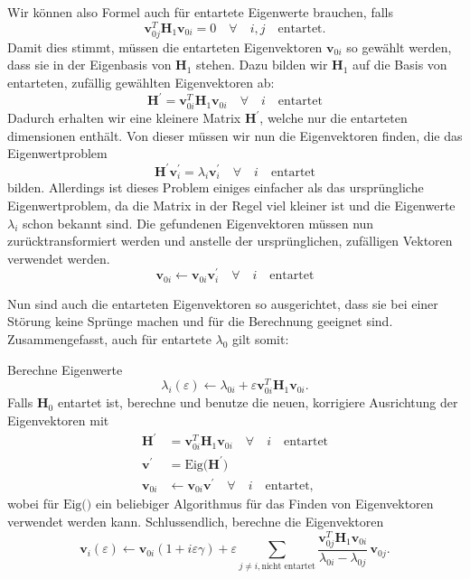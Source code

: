Wir können also Formel  auch für entartete Eigenwerte brauchen, falls
\begin{equation}
    \bm v_{0j}^T \bm H_1 \bm v_{0i} = 0 \quad \forall \quad i,j \quad \text{entartet}. \label{ew:eq:condition-degenerated}
\end{equation}
Damit dies stimmt, müssen die entarteten Eigenvektoren $\bm v_{0i}$ so gewählt werden, dass sie in der Eigenbasis von $\bm H_1$ stehen. %
Dazu bilden wir $\bm H_1$ auf die Basis von entarteten, zufällig gewählten Eigenvektoren ab:
\begin{equation}
    \bm H^\prime = \bm v_{0i}^T \bm H_1 \bm v_{0i} \quad \forall \quad i \quad \text{entartet}
\end{equation}
Dadurch erhalten wir eine kleinere Matrix $\bm H^\prime$, welche nur die entarteten dimensionen enthält.
Von dieser müssen wir nun die Eigenvektoren finden, die das Eigenwertproblem
\begin{equation}
    \bm H^\prime \bm v_{i}^\prime = \lambda_{i} \bm v_i^\prime \quad \forall \quad i \quad \text{entartet}
\end{equation}
bilden.
Allerdings ist dieses Problem einiges einfacher als das ursprüngliche Eigenwertproblem, da die Matrix in der Regel viel kleiner ist und die Eigenwerte $\lambda_i$ schon bekannt sind.
Die gefundenen Eigenvektoren müssen nun zurücktransformiert werden und anstelle der ursprünglichen, zufälligen Vektoren verwendet werden.
\begin{equation}
    \bm v_{0i} \gets \bm v_{0i} \bm v_{i}^\prime \quad \forall \quad i \quad \text{entartet}
\end{equation}

Nun sind auch die entarteten Eigenvektoren so ausgerichtet, dass sie bei einer Störung keine Sprünge machen und für die Berechnung geeignet sind.
Zusammengefasst, auch für entartete $\lambda_0$ gilt somit:
\begin{aufloesung}
Berechne Eigenwerte
\begin{equation*}
    \lambda_i(\varepsilon)
    \gets
    \lambda_{0i} + \varepsilon \bm v_{0i}^T \bm H_1 \bm v_{0i}.
\end{equation*}
Falls $\bm H_0$ entartet ist, berechne und benutze die neuen, korrigiere Ausrichtung der Eigenvektoren mit
\begin{align*}
    \bm H^\prime & = \bm v_{0i}^T \bm H_1 \bm v_{0i} \quad \forall \quad i \quad \text{entartet} \\
    \bm v^\prime & = \mathrm{Eig} \Big( \bm H^\prime \Big) \\
    \bm v_{0i} & \gets \bm v_{0i} \bm v^\prime  \quad \forall \quad i \quad \text{entartet},
\end{align*}
wobei für $\mathrm{Eig} \Big( \Big)$ ein beliebiger Algorithmus für das Finden von Eigenvektoren verwendet werden kann.
Schlussendlich, berechne die Eigenvektoren
\begin{equation*}
    \bm v_i(\varepsilon)
    \gets
    \bm v_{0i} ( 1 + i \varepsilon \gamma ) + \varepsilon \sum_{j \neq i, \text{nicht entartet}}
    \frac{\bm v_{0j}^T \bm H_1 \bm v_{0i}}{\lambda_{0i} - \lambda_{0j}}
    \, \bm v_{0j}.
\end{equation*}
\end{aufloesung}
